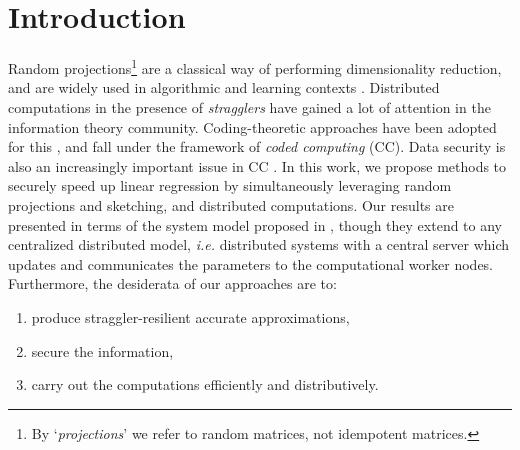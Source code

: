 \documentclass[journal,letterpaper,onecolumn,twoside,nofonttune]{IEEEtran}
\begin{document}
\section{Introduction}
\label{intro}


Random projections\footnote{By `\textit{projections}' we refer to random matrices, not idempotent matrices.} are a classical way of performing dimensionality reduction, and are widely used in algorithmic and learning contexts \cite{Vem05,Woo14,DMMS11,DM16}. Distributed computations in the presence of \textit{stragglers} have gained a lot of attention in the information theory community. Coding-theoretic approaches have been adopted for this \cite{LLPPR17,reisizadeh2017coded,li2016coded,li2017coding,LSR17,dutta2016short,ramamoorthy2019universally,YSRKSA18,RRG20,CT19,CPH20c,CPH20b,OUG20,OBGU20,CMH21,RCHV23,CPH23}, and fall under the framework of \textit{coded computing} (CC). Data security is also an increasingly important issue in CC \cite{LA20}. In this work, we propose methods to securely speed up linear regression by simultaneously leveraging random projections and sketching, and distributed computations. Our results are presented in terms of the system model proposed in \cite{LLPPR17}, though they extend to any centralized distributed model, \textit{i.e.} distributed systems with a central server which updates and communicates the parameters to the computational worker nodes. Furthermore, the desiderata of our approaches are to:
\begin{enumerate}[label=(\Roman*)]
  \item produce straggler-resilient accurate approximations,
  \item secure the information,
  \item carry out the computations efficiently and distributively.
\end{enumerate}
\end{document}
